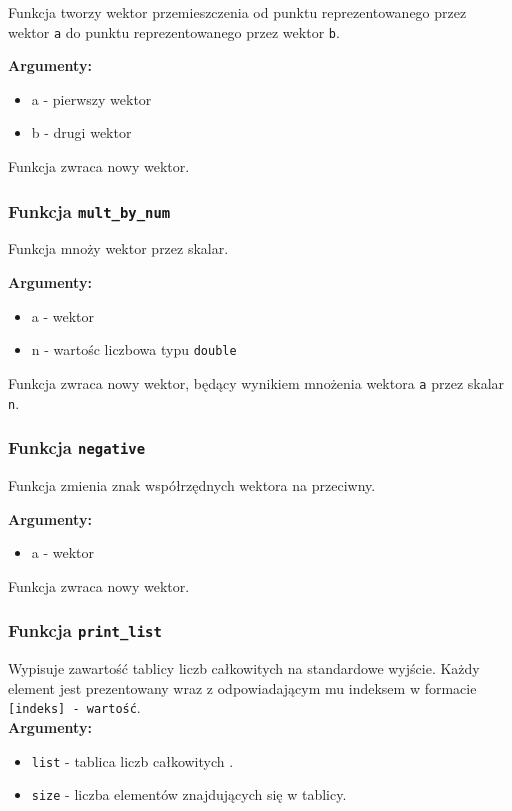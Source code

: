\documentclass[]{article}
\begin{document}
Funkcja tworzy wektor przemieszczenia od punktu reprezentowanego przez wektor \texttt{a} do punktu reprezentowanego przez wektor \texttt{b}.

\textbf{Argumenty:}
\begin{itemize}
    \item a - pierwszy wektor
    \item b - drugi wektor
\end{itemize}
Funkcja zwraca nowy wektor.

\subsubsection{Funkcja \texttt{mult\_by\_num}}

Funkcja mnoży wektor przez skalar.

\textbf{Argumenty:}
\begin{itemize}
    \item a - wektor
    \item n - wartośc liczbowa typu \texttt{double}
\end{itemize}
Funkcja zwraca nowy wektor, będący wynikiem mnożenia wektora \texttt{a} przez skalar \texttt{n}.

\subsubsection{Funkcja \texttt{negative}}

Funkcja zmienia znak współrzędnych wektora na przeciwny.

\textbf{Argumenty:}
\begin{itemize}
    \item a - wektor
\end{itemize}
Funkcja zwraca nowy wektor.
\subsubsection{Funkcja \texttt{print\_list}}

Wypisuje zawartość tablicy liczb całkowitych na 
standardowe wyjście. Każdy element jest prezentowany wraz z odpowiadającym mu indeksem w formacie \texttt{[indeks] - wartość}.\\
\textbf{Argumenty:}
\begin{itemize}
\item \texttt{list} - tablica liczb całkowitych .
\item \texttt{size} - liczba elementów znajdujących się w tablicy.
\end{itemize}
\end{document}
